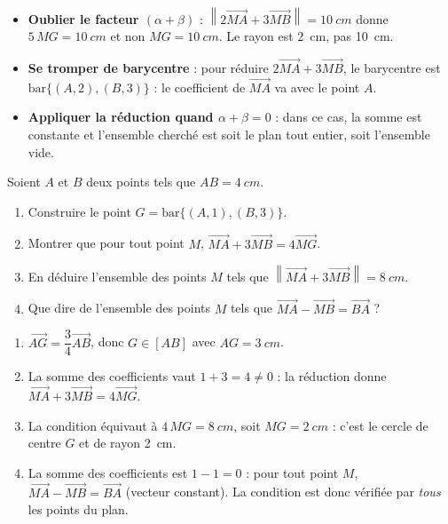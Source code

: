 \documentclass[11pt]{article}
\begin{document}
\begin{attention}
\begin{itemize}
\item \textbf{Oublier le facteur $(\alpha+\beta)$} : $\left\|2\overrightarrow{MA}+3\overrightarrow{MB}\right\|=\SI{10}{cm}$ donne $5\,MG=\SI{10}{cm}$ et non $MG=\SI{10}{cm}$. Le rayon est \SI{2}{cm}, pas \SI{10}{cm}.
\item \textbf{Se tromper de barycentre} : pour réduire $2\overrightarrow{MA}+3\overrightarrow{MB}$, le barycentre est $\text{bar}\{(A,2),(B,3)\}$ : le coefficient de $\overrightarrow{MA}$ va avec le point $A$.
\item \textbf{Appliquer la réduction quand $\alpha+\beta=0$} : dans ce cas, la somme est constante et l'ensemble cherché est soit le plan tout entier, soit l'ensemble vide.
\end{itemize}
\end{attention}

\begin{exercice}[À faire]
Soient $A$ et $B$ deux points tels que $AB=\SI{4}{cm}$.
\begin{enumerate}
\item Construire le point $G=\text{bar}\{(A,1),(B,3)\}$.
\item Montrer que pour tout point $M$, $\overrightarrow{MA}+3\overrightarrow{MB}=4\overrightarrow{MG}$.
\item En déduire l'ensemble des points $M$ tels que $\left\|\overrightarrow{MA}+3\overrightarrow{MB}\right\|=\SI{8}{cm}$.
\item Que dire de l'ensemble des points $M$ tels que $\overrightarrow{MA}-\overrightarrow{MB}=\overrightarrow{BA}$ ?
\end{enumerate}
\end{exercice}

\begin{corrige}[Exercice]
\begin{enumerate}
\item $\overrightarrow{AG}=\dfrac{3}{4}\overrightarrow{AB}$, donc $G\in[AB]$ avec $AG=\SI{3}{cm}$.
\item La somme des coefficients vaut $1+3=4\neq 0$ : la réduction donne $\overrightarrow{MA}+3\overrightarrow{MB}=4\overrightarrow{MG}$.
\item La condition équivaut à $4\,MG=\SI{8}{cm}$, soit $MG=\SI{2}{cm}$ : c'est le cercle de centre $G$ et de rayon \SI{2}{cm}.
\item La somme des coefficients est $1-1=0$ : pour tout point $M$, $\overrightarrow{MA}-\overrightarrow{MB}=\overrightarrow{BA}$ (vecteur constant). La condition est donc vérifiée par \emph{tous} les points du plan.
\end{enumerate}
\end{corrige}
\end{document}
